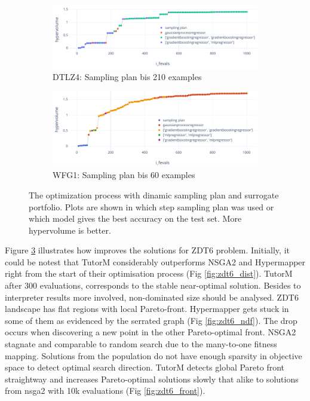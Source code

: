     \begin{figure}
        \centering
        \begin{subfigure}{\textwidth}
            \includegraphics[width=\textwidth]{content/images/dtlz4_models}
            \caption{DTLZ4: Sampling plan bis 210 examples}
            \label{fig:dtlz4_models_210}
        \end{subfigure}
        
        \begin{subfigure}{\textwidth}
            \includegraphics[width=\textwidth]{content/images/wfg1_models}
            \caption{WFG1: Sampling plan bis 60 examples}
            \label{fig:wfg1_models_60}
        \end{subfigure} 

        \caption[The optimization process with dinamic sampling plan and surrogate portfolio.]{The optimization process with dinamic sampling plan and surrogate portfolio. Plots are shown in which step sampling plan was used or which model gives the best accuracy on the test set. More hypervolume is better.}
        \label{fig:changing_models}    
    \end{figure}


    Figure \ref{fig:changing_models} illustrates how improves the solutions for ZDT6 problem. Initially, it could be notest that TutorM considerably outperforms NSGA2 and Hypermapper right from the start of their optimisation process (Fig \ref{fig:zdt6_dist}). TutorM after 300 evaluations, corresponds to the stable near-optimal solution. Besides to interpreter results more involved, non-dominated size should be analysed. ZDT6 landscape has flat regions with local Pareto-front. Hypermapper gets stuck in some of them as evidenced by the serrated graph (Fig \ref{fig:zdt6_ndf}). The drop occurs when discovering a new point in the other Pareto-optimal front. NSGA2 stagnate and comparable to random search due to the many-to-one fitness mapping. Solutions from the population do not have enough sparsity in objective space to detect optimal search direction. TutorM detects global Pareto front straightway and increases Pareto-optimal solutions slowly that alike to solutions from nsga2 with 10k evaluations (Fig \ref{fig:zdt6_front}).

